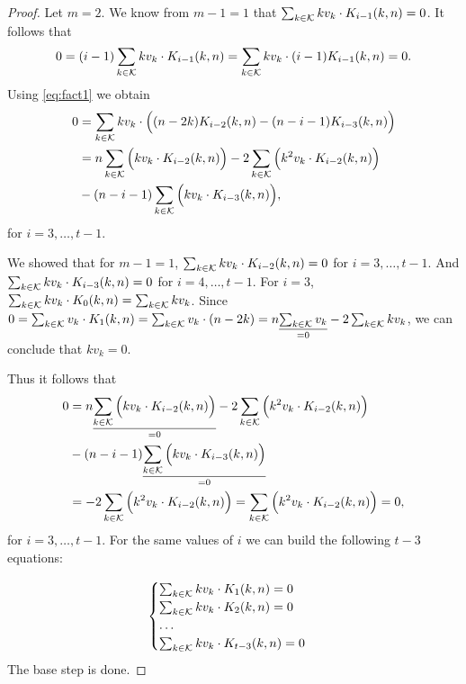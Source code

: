 \begin{proof}
    Let $m = 2$. We know from $m - 1 = 1$ that $\sum_{k \in \mathcal{K}} kv_k \cdot K_{i-1}(k, n) = 0$. It follows that
    $$
    0 = (i-1)\sum_{k \in \mathcal{K}} kv_k \cdot K_{i-1}(k, n) = \sum_{k \in \mathcal{K}} kv_k \cdot (i-1)K_{i-1}(k, n) = 0.
    $$
    Using \cref{eq:fact1} we obtain
    \begin{equation*}
    \begin{split}
        0 &= \sum_{k \in \mathcal{K}} kv_k \cdot \Big( (n - 2k)K_{i-2}(k, n) - (n - i - 1)K_{i-3}(k, n) \Big)\\
        & = n \sum_{k \in \mathcal{K}} \Big( kv_k \cdot K_{i-2}(k, n) \Big) - 2\sum_{k \in \mathcal{K}} \Big( k^2v_k \cdot K_{i-2}(k, n) \Big)\\& - (n - i - 1)\sum_{k \in \mathcal{K}} \Big( kv_k \cdot K_{i-3}(k, n) \Big),
    \end{split}
    \end{equation*}
    for $i = 3, \ldots, t - 1$.

    We showed that for $m - 1 = 1$, $\sum_{k \in \mathcal{K}} kv_k \cdot K_{i-2}(k,n) = 0$ for $i = 3, \ldots, t-1$. And $\sum_{k \in \mathcal{K}} kv_k \cdot K_{i-3}(k,n) = 0$ for $i = 4, \ldots, t-1$. For $i = 3$, $\sum_{k \in \mathcal{K}} kv_k \cdot K_0(k, n) = \sum_{k \in \mathcal{K}} kv_k$. Since $0 = \sum_{k \in \mathcal{K}} v_k \cdot K_1(k, n) = \sum_{k \in \mathcal{K}} v_k \cdot(n - 2k) = n\underset{=0}{\underline{\sum_{k \in \mathcal{K}} v_k}} -2\sum_{k \in \mathcal{K}} kv_k$, we can conclude that $ kv_k = 0$.

    Thus it follows that
    \begin{equation*}
        \begin{split}
            0 &= n \underset{=0}{\underline{\sum_{k \in \mathcal{K}} \Big( kv_k \cdot K_{i-2}(k, n) \Big)}} - 2\sum_{k \in \mathcal{K}} \Big( k^2v_k \cdot K_{i-2}(k, n) \Big)\\& - (n - i - 1)\underset{=0}{\underline{\sum_{k \in \mathcal{K}} \Big( kv_k \cdot K_{i-3}(k, n) \Big)}}\\
            &= - 2\sum_{k \in \mathcal{K}} \Big( k^2v_k \cdot K_{i-2}(k, n) \Big) = \sum_{k \in \mathcal{K}} \Big( k^2v_k \cdot K_{i-2}(k, n) \Big) = 0,
        \end{split}
    \end{equation*}
    for $i = 3, \ldots, t-1$. For the same values of $i$ we can build the following $t-3$ equations:

    \begin{equation*}
        \begin{cases}
            \sum_{k \in \mathcal{K}} kv_k \cdot K_1(k, n) = 0\\
            \sum_{k \in \mathcal{K}} kv_k \cdot K_2(k, n) = 0\\
            \ldots\\
            \sum_{k \in \mathcal{K}} kv_k \cdot K_{t-3}(k, n) = 0\\
        \end{cases}
    \end{equation*}
    The base step is done.


\end{proof}
